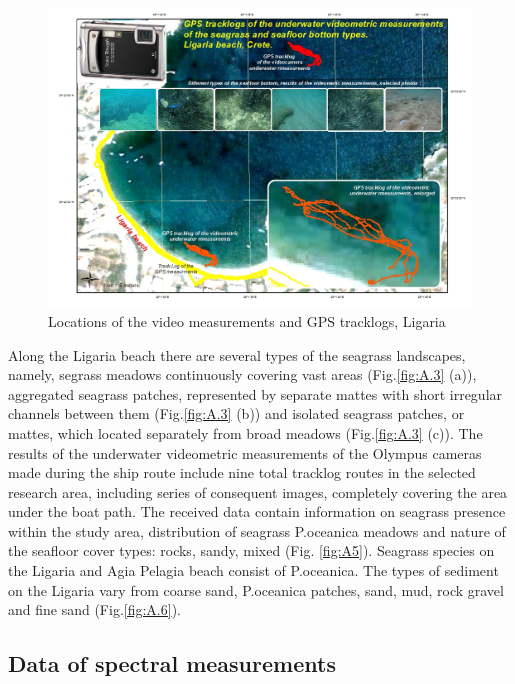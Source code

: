 \documentclass[10pt, a4paper]{article}
\begin{document}
\begin{figure}[h]
	\centering
	\includegraphics[scale=0.40]{Fig-21.jpg}
	\caption{Locations of the video measurements and GPS tracklogs, Ligaria}
	\label{fig:3.6}
\end{figure}

Along the Ligaria beach there are several types of the seagrass landscapes, namely, segrass meadows
continuously covering vast areas (Fig.\ref{fig:A.3} (a)), aggregated seagrass patches, represented by separate mattes with short irregular channels between them (Fig.\ref{fig:A.3} (b)) and isolated seagrass patches, or mattes,
which located separately from broad meadows (Fig.\ref{fig:A.3} (c)).
The results of the underwater videometric measurements of the Olympus cameras made during the
ship route include nine total tracklog routes in the selected research area, including series of
consequent images, completely covering the area under the boat path. The received data contain
information on seagrass presence within the study area, distribution of seagrass P.oceanica meadows
and nature of the seafloor cover types: rocks, sandy, mixed (Fig. \ref{fig:A5}). Seagrass species on the Ligaria and Agia
Pelagia beach consist of P.oceanica. The types of sediment on the Ligaria vary from coarse sand,
P.oceanica patches, sand, mud, rock gravel and fine sand (Fig.\ref{fig:A.6}).

\subsection{Data of spectral measurements}
\end{document}
